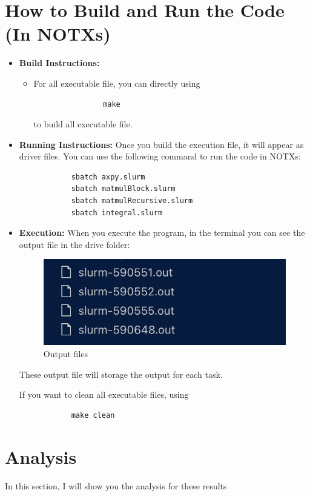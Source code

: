 \documentclass[11pt]{article}
\begin{document}
\section{How to Build and Run the Code (In NOTXs)}
\label{sec:build_run}
\begin{itemize}
    \item \textbf{Build Instructions:} 
        \begin{itemize}
            \item For all executable file, you can directly using
            \begin{verbatim}
                make
            \end{verbatim}
            to build all executable file.
            
        \end{itemize}
    \item \textbf{Running Instructions:} 
        Once you build the execution file, it will appear as driver files. You can use the following command to run the code in NOTXs:
        \begin{verbatim}
            sbatch axpy.slurm
            sbatch matmulBlock.slurm
            sbatch matmulRecursive.slurm
            sbatch integral.slurm
        \end{verbatim}
    \item  \textbf{Execution: }
        When you execute the program, in the terminal you can see the output file in the drive folder:
        \begin{figure}[H]
            \centering
            \includegraphics[width=0.5\linewidth]{Assignments/HW2/docs/images/output_files.png}
            \caption{Output files}
            \label{fig:Output files}
        \end{figure}
        These output file will storage the output for each task.

        If you want to clean all executable files, using
        \begin{verbatim}
            make clean
        \end{verbatim}
\end{itemize}


\section{Analysis}
In this section, I will show you the analysis for these results
\end{document}
